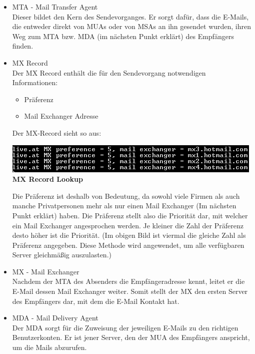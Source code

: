 \documentclass[12pt,a4paper]{report}
\begin{document}
\begin{onehalfspace}
\begin{itemize}
\begin{itemize}
\end{itemize}
\item MTA - Mail Transfer Agent\\\label{itm:MTA}
Dieser bildet den Kern des Sendevorganges. Er sorgt dafür, dass die E-Mails, die entweder direkt von MUAs oder von MSAs an ihn gesendet wurden, ihren Weg zum MTA bzw. MDA (im nächsten Punkt erklärt) des Empfängers finden.
\item MX Record\\\label{itm:MX Record}
Der MX Record enthält die für den Sendevorgang notwendigen Informationen:
\begin{itemize}
\item Präferenz
\item Mail Exchanger Adresse
\end{itemize}
Der MX-Record sieht so aus:
\begin{center}
\includegraphics[scale=1]{../docs/lyaton/graphics/MX-Record.png}\\
\textbf{MX Record Lookup}
\end{center}
Die Präferenz ist deshalb von Bedeutung, da sowohl viele Firmen als auch manche Privatpersonen mehr als nur einen Mail Exchanger (Im nächsten Punkt erklärt) haben. Die Präferenz stellt also die Priorität dar, mit welcher ein Mail Exchanger angesprochen werden. Je kleiner die Zahl der Präferenz desto höher ist die Priorität. (Im obigen Bild ist viermal die gleiche Zahl als Präferenz angegeben. Diese Methode wird angewendet, um alle verfügbaren Server gleichmäßig auszulasten.)
\item MX - Mail Exchanger\\\label{itm:MX}
Nachdem der MTA des Absenders die Empfängeradresse kennt, leitet er die E-Mail dessen Mail Exchanger weiter. Somit stellt der MX den ersten Server des Empfängers dar, mit dem die E-Mail Kontakt hat. 
\item MDA - Mail Delivery Agent\\\label{itm:MDA}
Der MDA sorgt für die Zuweisung der jeweiligen E-Mails zu den richtigen Benutzerkonten. Er ist jener Server, den der MUA des Empfängers anspricht, um die Mails abzurufen.
\end{itemize}
\begin{center}

\end{center}
\end{onehalfspace}
\end{document}
